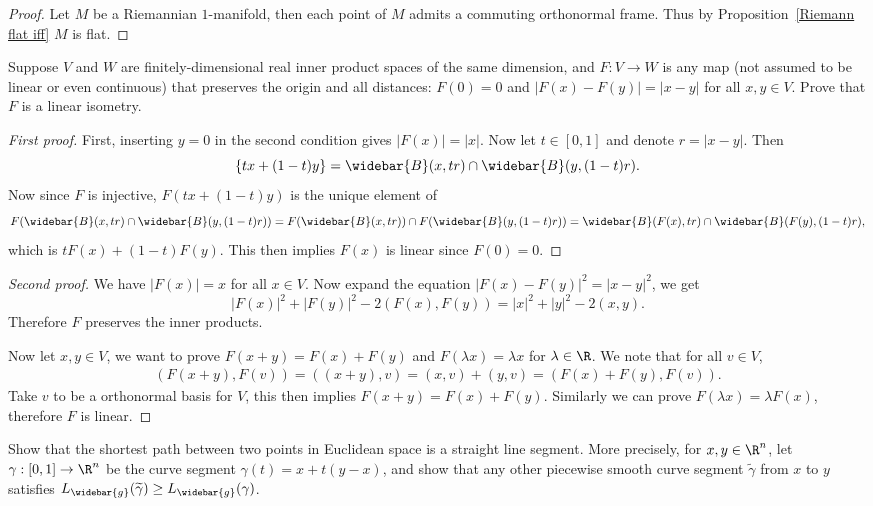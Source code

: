 \begin{proof}
Let $M$ be a Riemannian $1$-manifold, then each point of $M$ admits a commuting orthonormal frame. Thus by Proposition~\ref{Riemann flat iff} $M$ is flat.
\end{proof}
\begin{exercise}\label{isometry is linear}
Suppose $V$ and $W$ are finitely-dimensional real inner product spaces of the same dimension, and $F:V\to W$ is any map (not assumed to be linear or even continuous) that 
preserves the origin and all distances: $F(0)=0$ and $|F(x)-F(y)|=|x-y|$ for all $x,y\in V$. Prove that $F$ is a linear isometry.
\end{exercise}
\begin{proof}[First proof]
First, inserting $y=0$ in the second condition gives $|F(x)|=|x|$. Now let $t\in[0,1]$ and denote $r=|x-y|$. Then 
\[\{tx+(1-t)y\}=\widebar{B}(x,tr)\cap\widebar{B}(y,(1-t)r).\]
Now since $F$ is injective, $F(tx+(1-t)y)$ is the unique element of 
\[F(\widebar{B}(x,tr)\cap\widebar{B}(y,(1-t)r))=F(\widebar{B}(x,tr))\cap F(\widebar{B}(y,(1-t)r))=\widebar{B}(F(x),tr)\cap\widebar{B}(F(y),(1-t)r),\]
which is $tF(x)+(1-t)F(y)$. This then implies $F(x)$ is linear since $F(0)=0$.
\end{proof}
\begin{proof}[Second proof]
We have $|F(x)|=x$ for all $x\in V$. Now expand the equation $|F(x)-F(y)|^2=|x-y|^2$, we get
\[|F(x)|^2+|F(y)|^2-2(F(x),F(y))=|x|^2+|y|^2-2(x,y).\]
Therefore $F$ preserves the inner products.\par
Now let $x,y\in V$, we want to prove $F(x+y)=F(x)+F(y)$ and $F(\lambda x)=\lambda x$ for $\lambda\in\R$. We note that for all $v\in V$,
\begin{align*}
(F(x+y),F(v))=((x+y),v)=(x,v)+(y,v)=(F(x)+F(y),F(v)).
\end{align*}
Take $v$ to be a orthonormal basis for $V$, this then implies $F(x+y)=F(x)+F(y)$. Similarly we can prove $F(\lambda x)=\lambda F(x)$, therefore $F$ is linear.
\end{proof}
\begin{exercise}\label{Euclidean shortest path}
Show that the shortest path between two points in Euclidean space is a straight line segment. More precisely, for $x,y\in\R^n$, let $\gamma:[0,1]\to\R^n$ be the 
curve segment $\gamma(t)=x+t(y-x)$, and show that any other piecewise smooth curve segment $\widetilde{\gamma}$ from $x$ to $y$ satisfies 
$L_{\widebar{g}}(\widetilde{\gamma})\geq L_{\widebar{g}}(\gamma)$.
\end{exercise}
